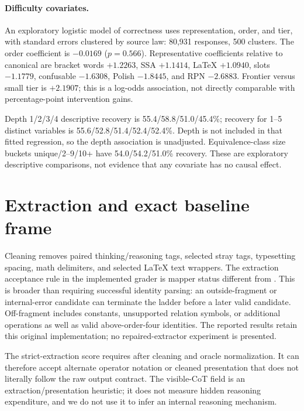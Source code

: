 \documentclass{article}
\newcommand{\code}[1]{\texttt{\detokenize{#1}}}
\newcommand{\pct}{\%}
\begin{document}
\paragraph{Difficulty covariates.}
An exploratory logistic model of correctness uses representation, order, and
tier, with standard errors clustered by source law: 80,931 responses,
500 clusters. The order coefficient is $-0.0169$ ($p=0.566$).
Representative coefficients relative to canonical are bracket words $+1.2263$,
SSA $+1.1414$, LaTeX $+1.0940$, slots $-1.1779$, confusable $-1.6308$,
Polish $-1.8445$, and RPN $-2.6883$. Frontier versus small tier is $+2.1907$;
this is a log-odds association, not directly comparable with percentage-point
intervention gains.

Depth 1/2/3/4 descriptive recovery is 55.4/58.8/51.0/45.4\pct{}; recovery
for 1--5 distinct variables is 55.6/52.8/51.4/52.4/52.4\pct{}.
Depth is not included in that fitted regression, so the depth association is
unadjusted. Equivalence-class size buckets unique/2--9/10+ have
54.0/54.2/51.0\pct{} recovery. These are exploratory descriptive comparisons,
not evidence that any covariate has no causal effect.

\section{Extraction and exact baseline frame}
\label{app:extraction}

Cleaning removes paired thinking/reasoning tags, selected stray tags,
typesetting spacing, math delimiters, and selected LaTeX text wrappers.
The extraction acceptance rule in the implemented grader is mapper status
different from \code{parse-failure}. This is broader than requiring successful
identity parsing: an outside-fragment or internal-error candidate can terminate
the ladder before a later valid candidate. Off-fragment includes constants,
unsupported relation symbols, or additional operations as well as valid
above-order-four identities. The reported results retain this original
implementation; no repaired-extractor experiment is presented.

The strict-extraction score requires \code{exact} after cleaning and oracle
normalization. It can therefore accept alternate operator notation or cleaned
presentation that does not literally follow the raw output contract. The
visible-CoT field is an extraction/presentation heuristic; it does not measure
hidden reasoning expenditure, and we do not use it to infer an internal
reasoning mechanism.
\end{document}
